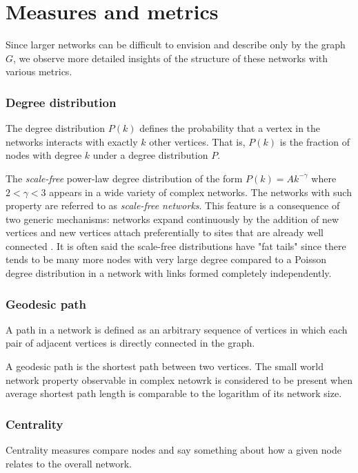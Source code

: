 \documentclass[times, utf8, diplomski]{fer}
\begin{document}
\section{Measures and metrics}
Since larger networks can be difficult to envision and describe only by the graph $G$, we observe more detailed insights of the structure of these networks with various metrics. 

\subsubsection{Degree distribution}
The degree distribution $P(k)$ defines the probability that a vertex in the networks interacts with exactly $k$ other vertices. That is, $P(k)$ is the fraction of nodes with degree $k$ under a degree distribution $P$.  

The \emph{scale-free} power-law degree distribution of the form $P(k) = Ak^{-\gamma}$ where $2<\gamma<3$ appears in a wide variety of complex networks. The networks with such property are referred to as \emph{scale-free networks}. This feature is a consequence of two generic mechanisms: networks expand continuously by the addition of new vertices and new vertices attach preferentially to sites that are already well connected \cite{Barabasi99emergenceof}. It is often said the scale-free distributions have "fat tails" since there tends to be many more nodes with very large degree compared to a Poisson degree distribution in a network with links formed completely independently.


\subsubsection{Geodesic path}

A path in a network is defined as an arbitrary sequence of vertices in which each pair of adjacent vertices is  directly connected in the graph. 

A geodesic path is the shortest path between two vertices.
The small world network property observable in complex netowrk is considered to be present when average shortest path length is comparable to the logarithm of its network size. 

\subsubsection{Centrality}
Centrality measures compare  nodes and say something about how a given node relates to the overall network. 
\end{document}
